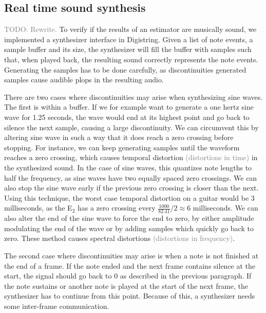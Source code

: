 \documentclass[a4paper,10pt,twocolumn]{article}
\newcommand{\note}[2]{#1${}_{#2}$}
\begin{document}
\subsection{Real time sound synthesis}
\textcolor{gray}{TODO: Rewrite. }
To verify if the results of an estimator are musically sound, we implemented a synthesizer interface in Digistring. Given a list of note events, a sample buffer and its size, the synthesizer will fill the buffer with samples such that, when played back, the resulting sound correctly represents the note events. Generating the samples has to be done carefully, as discontinuities generated samples cause audible plops in the resulting audio.%

There are two cases where discontinuities may arise when synthesizing sine waves. The first is within a buffer. If we for example want to generate a one hertz sine wave for 1.25 seconds, the wave would end at its highest point and go back to silence the next sample, causing a large discontinuity. We can circumvent this by altering sine wave in such a way that it does reach a zero crossing before stopping. For instance, we can keep generating samples until the waveform reaches a zero crossing, which causes temporal distortion \textcolor{gray}{(distortions in time)} in the synthesized sound. In the case of sine waves, this quantizes note lengths to half the frequency, as sine waves have two equally spaced zero crossings. We can also stop the sine wave early if the previous zero crossing is closer than the next. Using this technique, the worst case temporal distortion on a guitar would be 3 milliseconds, as the \note{E}{2} has a zero crossing every $ \frac{1000}{82.41} / 2 \approx 6 $ milliseconds. We can also alter the end of the sine wave to force the end to zero, by either amplitude modulating the end of the wave or by adding samples which quickly go back to zero. These method causes spectral distortions \textcolor{gray}{(distortions in frequency)}.

The second case where discontinuities may arise is when a note is not finished at the end of a frame. If the note ended and the next frame contains silence at the start, the signal should go back to 0 as described in the previous paragraph. If the note sustains or another note is played at the start of the next frame, the synthesizer has to continue from this point. Because of this, a synthesizer needs some inter-frame communication.
\end{document}
